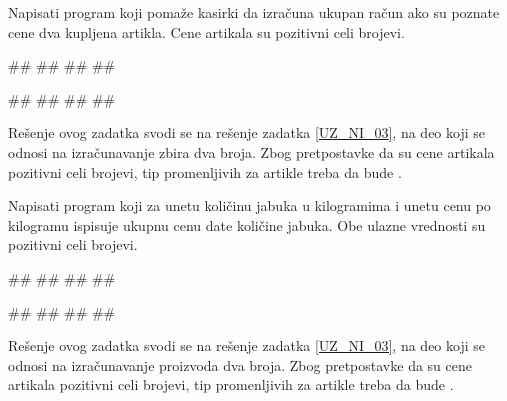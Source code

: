 \begin{Exercise}[label=UZ_NI_04]
Napisati program koji pomaže kasirki da izračuna ukupan račun ako su poznate cene dva kupljena artikla. Cene artikala su pozitivni celi brojevi.

\begin{miditest}
\begin{upotreba}{1}
#\naslovInt#
##
##
##
\end{upotreba}
\end{miditest}
\begin{miditest}
\begin{upotreba}{2}
#\naslovInt#
##
##
##
\end{upotreba}
\end{miditest}

\end{Exercise}
\ifresenja
\begin{Answer}[ref=UZ_NI_04]

Rešenje ovog zadatka svodi se na rešenje zadatka \ref{UZ_NI_03}, na deo koji se odnosi na 
izračunavanje zbira dva broja. Zbog pretpostavke da su cene artikala pozitivni celi brojevi, 
tip promenljivih za artikle treba da bude .
\end{Answer}
\fi


\begin{Exercise}[label=UZ_NI_05]
Napisati program koji za unetu količinu jabuka u kilogramima i unetu
cenu po kilogramu ispisuje ukupnu cenu date količine jabuka. 
Obe ulazne vrednosti su pozitivni celi brojevi.

\begin{miditest}
\begin{upotreba}{1}
#\naslovInt#
##
##
##
\end{upotreba}
\end{miditest}
\begin{miditest}
\begin{upotreba}{1}
#\naslovInt#
##
##
##
\end{upotreba}
\end{miditest}
\end{Exercise}
\ifresenja
\begin{Answer}[ref=UZ_NI_05]

Rešenje ovog zadatka svodi se na rešenje zadatka \ref{UZ_NI_03}, na deo koji se odnosi na izračunavanje proizvoda dva broja. 
Zbog pretpostavke da su cene artikala pozitivni celi brojevi, tip promenljivih za artikle treba da bude .
\end{Answer}
\fi


